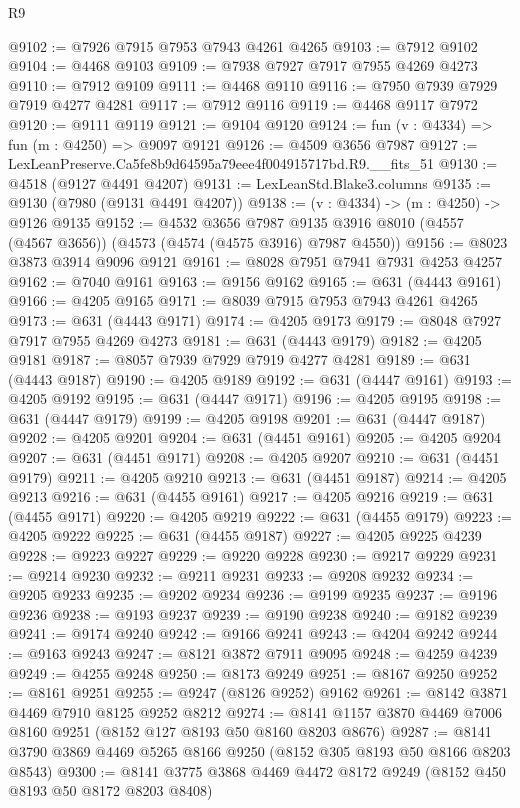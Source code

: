 \begin{lexlean}{R9}
\begin{coremodule}
@9102 := @7926 @7915 @7953 @7943 @4261 @4265
@9103 := @7912 @9102
@9104 := @4468 @9103
@9109 := @7938 @7927 @7917 @7955 @4269 @4273
@9110 := @7912 @9109
@9111 := @4468 @9110
@9116 := @7950 @7939 @7929 @7919 @4277 @4281
@9117 := @7912 @9116
@9119 := @4468 @9117 @7972
@9120 := @9111 @9119
@9121 := @9104 @9120
@9124 := fun (v : @4334) => fun (m : @4250) => @9097 @9121
@9126 := @4509 @3656 @7987
@9127 := LexLeanPreserve.Ca5fe8b9d64595a79eee4f004915717bd.R9.__fits_51
@9130 := @4518 (@9127 @4491 @4207)
@9131 := LexLeanStd.Blake3.columns
@9135 := @9130 (@7980 (@9131 @4491 @4207))
@9138 := (v : @4334) -> (m : @4250) -> @9126 @9135
@9152 := @4532
    @3656
    @7987
    @9135
    @3916
    @8010
    (@4557 (@4567 @3656))
    (@4573 (@4574 (@4575 @3916) @7987 @4550))
@9156 := @8023 @3873 @3914 @9096 @9121
@9161 := @8028 @7951 @7941 @7931 @4253 @4257
@9162 := @7040 @9161
@9163 := @9156 @9162
@9165 := @631 (@4443 @9161)
@9166 := @4205 @9165
@9171 := @8039 @7915 @7953 @7943 @4261 @4265
@9173 := @631 (@4443 @9171)
@9174 := @4205 @9173
@9179 := @8048 @7927 @7917 @7955 @4269 @4273
@9181 := @631 (@4443 @9179)
@9182 := @4205 @9181
@9187 := @8057 @7939 @7929 @7919 @4277 @4281
@9189 := @631 (@4443 @9187)
@9190 := @4205 @9189
@9192 := @631 (@4447 @9161)
@9193 := @4205 @9192
@9195 := @631 (@4447 @9171)
@9196 := @4205 @9195
@9198 := @631 (@4447 @9179)
@9199 := @4205 @9198
@9201 := @631 (@4447 @9187)
@9202 := @4205 @9201
@9204 := @631 (@4451 @9161)
@9205 := @4205 @9204
@9207 := @631 (@4451 @9171)
@9208 := @4205 @9207
@9210 := @631 (@4451 @9179)
@9211 := @4205 @9210
@9213 := @631 (@4451 @9187)
@9214 := @4205 @9213
@9216 := @631 (@4455 @9161)
@9217 := @4205 @9216
@9219 := @631 (@4455 @9171)
@9220 := @4205 @9219
@9222 := @631 (@4455 @9179)
@9223 := @4205 @9222
@9225 := @631 (@4455 @9187)
@9227 := @4205 @9225 @4239
@9228 := @9223 @9227
@9229 := @9220 @9228
@9230 := @9217 @9229
@9231 := @9214 @9230
@9232 := @9211 @9231
@9233 := @9208 @9232
@9234 := @9205 @9233
@9235 := @9202 @9234
@9236 := @9199 @9235
@9237 := @9196 @9236
@9238 := @9193 @9237
@9239 := @9190 @9238
@9240 := @9182 @9239
@9241 := @9174 @9240
@9242 := @9166 @9241
@9243 := @4204 @9242
@9244 := @9163 @9243
@9247 := @8121 @3872 @7911 @9095
@9248 := @4259 @4239
@9249 := @4255 @9248
@9250 := @8173 @9249
@9251 := @8167 @9250
@9252 := @8161 @9251
@9255 := @9247 (@8126 @9252) @9162
@9261 := @8142 @3871 @4469 @7910 @8125 @9252 @8212
@9274 := @8141 @1157 @3870 @4469 @7006 @8160 @9251 (@8152 @127 @8193 @50 @8160 @8203 @8676)
@9287 := @8141 @3790 @3869 @4469 @5265 @8166 @9250 (@8152 @305 @8193 @50 @8166 @8203 @8543)
@9300 := @8141 @3775 @3868 @4469 @4472 @8172 @9249 (@8152 @450 @8193 @50 @8172 @8203 @8408)

\end{coremodule}
\end{lexlean}
